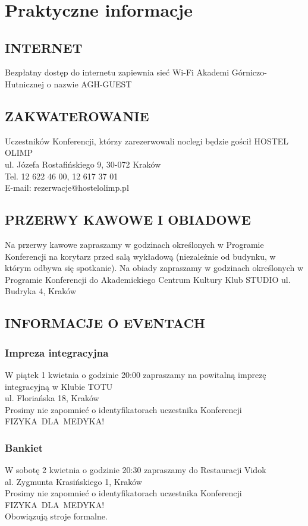 \documentclass[12pt, a4paper]{article}
\begin{document}
\title{ }
\author{ }
\date {}

\thispagestyle{title}

\section*{Praktyczne informacje}

\subsection*{INTERNET}
Bezpłatny dostęp do internetu zapiewnia sieć Wi-Fi Akademi Górniczo-Hutnicznej o nazwie AGH-GUEST
\subsection*{ZAKWATEROWANIE}
Uczestników Konferencji, którzy zarezerwowali noclegi będzie gościł HOSTEL OLIMP \\
ul. Józefa Rostafińskiego 9, 30-072 Kraków \\
Tel. 12 622 46 00, 12 617 37 01 \\
E-mail: rezerwacje@hostelolimp.pl \\

\subsection*{PRZERWY KAWOWE I OBIADOWE}
Na przerwy kawowe zapraszamy w godzinach określonych w Programie Konferencji na korytarz przed salą wykładową (niezależnie od budynku, w którym odbywa się spotkanie). Na obiady zapraszamy w godzinach określonych w Programie Konferencji do Akademickiego Centrum Kultury Klub STUDIO ul. Budryka 4, Kraków

\subsection*{INFORMACJE O EVENTACH}

\subsubsection*{Impreza integracyjna}
W piątek 1 kwietnia o godzinie 20:00 zapraszamy na powitalną imprezę integracyjną w Klubie TOTU\\ 
ul. Floriańska 18, Kraków\\
Prosimy nie zapomnieć o identyfikatorach uczestnika Konferencji \mbox{FIZYKA DLA MEDYKA!}

\subsubsection*{Bankiet} 
W sobotę 2 kwietnia o godzinie 20:30 zapraszamy do Restauracji Vidok \\
al. Zygmunta Krasińskiego 1, Kraków \\
Prosimy nie zapomnieć o identyfikatorach uczestnika Konferencji \mbox{FIZYKA DLA MEDYKA!} \\
Obowiązują stroje formalne.
\end{document}
